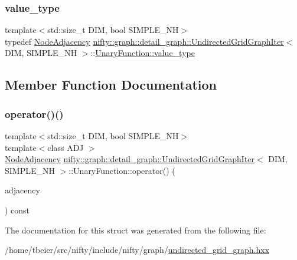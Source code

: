 \subsubsection{\texorpdfstring{value\+\_\+type}{value\_type}}
{\footnotesize\ttfamily template$<$std\+::size\+\_\+t D\+IM, bool S\+I\+M\+P\+L\+E\+\_\+\+NH$>$ \\
typedef \hyperlink{classnifty_1_1graph_1_1detail__graph_1_1UndirectedGridGraphIter_ab102d464df39aae71f7482baa37d8966}{Node\+Adjacency} \hyperlink{classnifty_1_1graph_1_1detail__graph_1_1UndirectedGridGraphIter}{nifty\+::graph\+::detail\+\_\+graph\+::\+Undirected\+Grid\+Graph\+Iter}$<$ D\+IM, S\+I\+M\+P\+L\+E\+\_\+\+NH $>$\+::\hyperlink{structnifty_1_1graph_1_1detail__graph_1_1UndirectedGridGraphIter_1_1UnaryFunction_a4a60979fef293486b48029f101ceaf66}{Unary\+Function\+::value\+\_\+type}}



\subsection{Member Function Documentation}
\mbox{\label{structnifty_1_1graph_1_1detail__graph_1_1UndirectedGridGraphIter_1_1UnaryFunction_a6e0c8bc7a5f99bca449d7e8337f5bdd6}} 
\subsubsection{\texorpdfstring{operator()()}{operator()()}}
{\footnotesize\ttfamily template$<$std\+::size\+\_\+t D\+IM, bool S\+I\+M\+P\+L\+E\+\_\+\+NH$>$ \\
template$<$class A\+DJ $>$ \\
\hyperlink{classnifty_1_1graph_1_1detail__graph_1_1UndirectedGridGraphIter_ab102d464df39aae71f7482baa37d8966}{Node\+Adjacency} \hyperlink{classnifty_1_1graph_1_1detail__graph_1_1UndirectedGridGraphIter}{nifty\+::graph\+::detail\+\_\+graph\+::\+Undirected\+Grid\+Graph\+Iter}$<$ D\+IM, S\+I\+M\+P\+L\+E\+\_\+\+NH $>$\+::Unary\+Function\+::operator() (\begin{DoxyParamCaption}\item[{const A\+DJ \&}]{adjacency }\end{DoxyParamCaption}) const\hspace{0.3cm}{\ttfamily [inline]}}



The documentation for this struct was generated from the following file\+:\begin{DoxyCompactItemize}
\item 
/home/tbeier/src/nifty/include/nifty/graph/\hyperlink{graph_2undirected__grid__graph_8hxx}{undirected\+\_\+grid\+\_\+graph.\+hxx}\end{DoxyCompactItemize}

